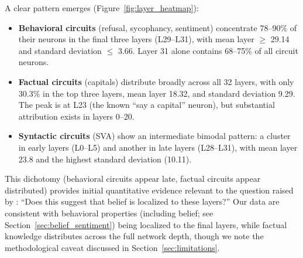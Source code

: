 \documentclass[11pt]{article}
\begin{document}
A clear pattern emerges (Figure~\ref{fig:layer_heatmap}):

\begin{itemize}[leftmargin=2em]
    \item \textbf{Behavioral circuits} (refusal, sycophancy, sentiment) concentrate 78--90\% of their neurons in the final three layers (L29--L31), with mean layer $\geq$ 29.14 and standard deviation $\leq$ 3.66. Layer 31 alone contains 68--75\% of all circuit neurons.

    \item \textbf{Factual circuits} (capitals) distribute broadly across all 32 layers, with only 30.3\% in the top three layers, mean layer 18.32, and standard deviation 9.29. The peak is at L23 (the known ``say a capital'' neuron), but substantial attribution exists in layers 0--20.

    \item \textbf{Syntactic circuits} (SVA) show an intermediate bimodal pattern: a cluster in early layers (L0--L5) and another in late layers (L28--L31), with mean layer 23.8 and the highest standard deviation (10.11).
\end{itemize}

This dichotomy (behavioral circuits appear late, factual circuits appear distributed) provides initial quantitative evidence relevant to the question raised by \citet{chalnick2025goodfire}: ``Does this suggest that belief is localized to these layers?''
Our data are consistent with behavioral properties (including belief; see Section~\ref{sec:belief_sentiment}) being localized to the final layers, while factual knowledge distributes across the full network depth, though we note the methodological caveat discussed in Section~\ref{sec:limitations}.
\end{document}
